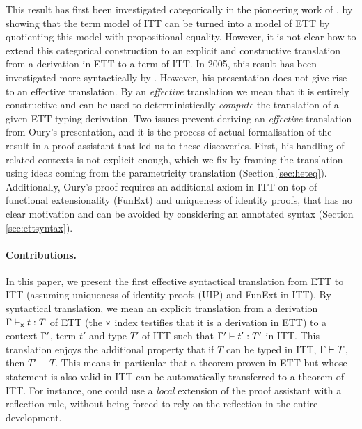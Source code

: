 This result has first been investigated categorically in the
pioneering work of ,
%
by showing that the term model of ITT can be turned into a model of ETT by
quotienting this model with propositional equality.
%
However, it is not clear how to extend this categorical construction
to an explicit and constructive translation from a derivation in ETT to
a term of ITT.
%
In 2005, this result has been investigated more syntactically by
. However, his presentation does not give
rise to an effective translation.
%
By an \emph{effective} translation we mean that it is entirely
constructive and can be used to deterministically \emph{compute} the
translation of a given ETT typing derivation.
%
Two issues prevent deriving an \emph{effective} translation from Oury's
presentation, and it is the process of actual formalisation of the
result in a proof assistant that led us to these discoveries. First, his
handling of related contexts is not explicit enough, which we fix by
framing the translation using ideas coming from the parametricity
translation (Section \ref{sec:heteq}). Additionally, Oury's proof
requires an additional axiom in ITT on top of functional
extensionality (FunExt)
and uniqueness of identity proofs, that has no clear motivation and can
be avoided by considering an annotated syntax (Section
\ref{sec:ettsyntax}).

\paragraph*{Contributions.}
In this paper, we present the first effective syntactical translation
from ETT to ITT (assuming uniqueness of identity proofs (UIP) and
FunExt in ITT).
%
By syntactical translation, we mean an explicit translation from a
derivation $\Gamma \vdash_{\mathsf{x}} t : T$ of ETT (the $\mathsf{x}$ index testifies that it
is a derivation in ETT) to a context $\Gamma'$, term
$t'$ and type $T'$ of ITT such that $\Gamma' \vdash t' : T'$ in ITT.
%
This translation enjoys the additional property that if $T$ can be
typed in ITT, \ie $\Gamma \vdash T$, then $T' \equiv T$.
%
This means in particular that a theorem proven in ETT but whose
statement is also valid in ITT can be automatically transferred to a theorem
of ITT. For instance, one could use a \emph{local} extension of the
\Coq proof assistant with a reflection rule, without being forced to rely on
the reflection in the entire development.

